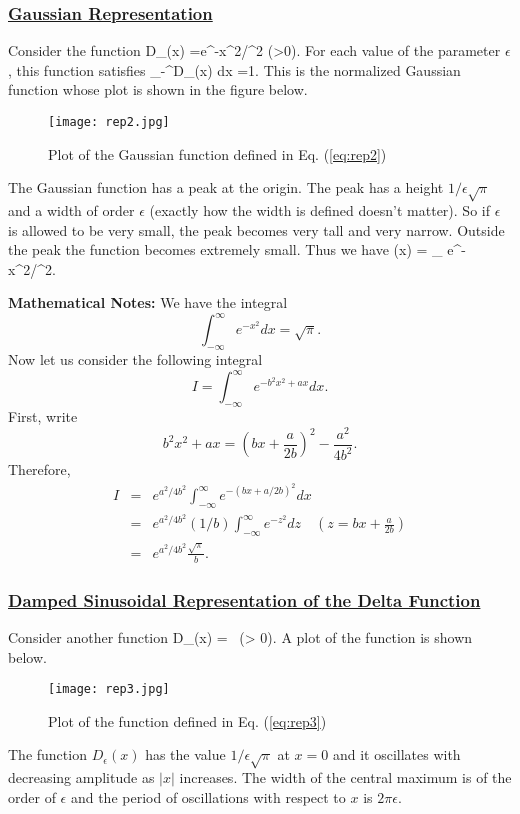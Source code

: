 \subsubsection{\underline{Gaussian Representation}}
Consider the function
\be
D_{\epsilon}(x) =e^{-x^2/\epsilon^2} \;\; (\epsilon>0).
\label{eq:rep2}
\ee
For each value of the parameter $\epsilon$, this function satisfies
\be
\int_{-\infty}^{\infty}D_{\epsilon}(x) dx =1.
\ee
This  is the normalized Gaussian function whose plot is shown in the figure below.
\begin{figure}[h]
\centering
\texttt{[image: rep2.jpg]}
\caption{Plot of the Gaussian function defined in Eq. (\ref{eq:rep2})}
\end{figure}

\noindent
The Gaussian function has a peak at the origin. The peak has a height $1/\epsilon\sqrt{\pi}$ and a width of order $\epsilon$
(exactly how the width is defined doesn't matter). So if $\epsilon$ is allowed to be very small, the peak becomes very tall and very 
narrow. Outside the peak the function becomes extremely small. Thus we have
\be
\delta(x) = \lim_{\epsilon {}}  e^{-x^2/\epsilon^2}.
\ee

\vspace{10 mm}
\noindent
{\bf Mathematical Notes:} \newline
\noindent
We have the integral
\[ \int_{-\infty}^{\infty}e^{-x^2}dx = \sqrt{\pi}. \]
Now let us consider the following integral
\[ I= \int_{-\infty}^{\infty}e^{-b^2x^2+ a x}dx.\]
First, write
\[ b^2x^2+ax = \left(bx+\frac{a}{2b}\right)^2-\frac{a^2}{4b^2} .\]
Therefore,
\begin{eqnarray*}
I & =& e^{a^2/4b^2}\int_{-\infty}^{\infty}e^{-(bx+a/2b)^2}dx \\
& = & e^{a^2/4b^2}(1/b)\int_{-\infty}^{\infty}e^{-z^2}dz \quad (z=bx+\frac{a}{2b}) \\
& = & e^{a^2/4b^2}\frac{\sqrt{\pi}}{b}.
\end{eqnarray*}

\subsubsection{\underline{Damped Sinusoidal Representation of the Delta Function}}
Consider another function
\be
D_{\epsilon}(x) = \, \quad (\epsilon > 0).
\label{eq:rep3}
\ee
A plot of the function is shown below.
\begin{figure}[ht]
\centering
\texttt{[image: rep3.jpg]}
\caption{Plot of the function defined in Eq. (\ref{eq:rep3})}
\end{figure}
The function $D_{\epsilon}(x)$ has the value $1/\epsilon\sqrt{\pi}$ at $x=0$ and it oscillates with decreasing amplitude
as $|x|$ increases. The width of the central maximum is of the order of $\epsilon$ and the period of oscillations with respect to
$x$ is $2\pi \epsilon$.



